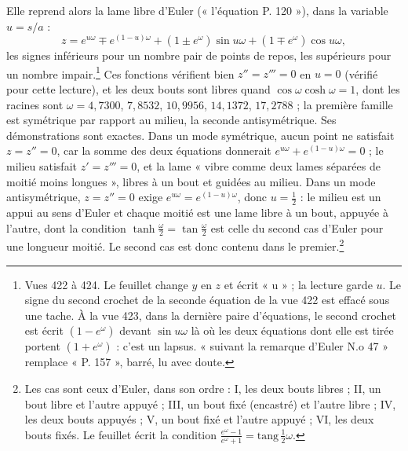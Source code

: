 \documentclass[11pt,a4paper]{article}
\begin{document}
Elle reprend alors la lame libre d'Euler (« l'équation P. 120 »), dans la variable
$u = s/a$ :
\[
z = e^{u\omega} \mp e^{(1-u)\omega} + (1 \pm e^{\omega})\sin u\omega + (1 \mp e^{\omega})\cos u\omega ,
\]
les signes inférieurs pour un nombre pair de points de repos, les supérieurs pour un
nombre impair.\footnote{Vues 422 à 424. Le feuillet change $y$ en $z$ et écrit « u » ;
la lecture garde $u$. Le signe du second crochet de la seconde équation de la vue 422
est effacé sous une tache. À la vue 423, dans la dernière paire d'équations, le
second crochet est écrit $(1-e^{\omega})$ devant $\sin u\omega$ là où les deux
équations dont elle est tirée portent $(1+e^{\omega})$ : c'est un lapsus. « suivant la
remarque d'Euler N.o 47 » remplace « P. 157 », barré, lu avec doute.} Ces fonctions
vérifient bien $z'' = z''' = 0$ en $u = 0$ (vérifié pour cette lecture), et les deux
bouts sont libres quand $\cos\omega\cosh\omega = 1$, dont les racines sont
$\omega = 4{,}7300$, $7{,}8532$, $10{,}9956$, $14{,}1372$, $17{,}2788$ ; la première
famille est symétrique par rapport au milieu, la seconde antisymétrique. Ses
démonstrations sont exactes. Dans un mode symétrique, aucun point ne satisfait
$z = z'' = 0$, car la somme des deux équations donnerait
$e^{u\omega} + e^{(1-u)\omega} = 0$ ; le milieu satisfait $z' = z''' = 0$, et la lame
« vibre comme deux lames séparées de moitié moins longues », libres à un bout et
guidées au milieu. Dans un mode antisymétrique, $z = z'' = 0$ exige
$e^{u\omega} = e^{(1-u)\omega}$, donc $u = \frac12$ : le milieu est un appui au sens
d'Euler et chaque moitié est une lame libre à un bout, appuyée à l'autre, dont la
condition $\tanh\frac{\omega}{2} = \tan\frac{\omega}{2}$ est celle du second cas
d'Euler pour une longueur moitié. Le second cas est donc contenu dans le
premier.\footnote{Les cas sont ceux d'Euler, dans son ordre : I, les deux bouts
libres ; II, un bout libre et l'autre appuyé ; III, un bout fixé (encastré) et l'autre
libre ; IV, les deux bouts appuyés ; V, un bout fixé et l'autre appuyé ; VI, les deux
bouts fixés. Le feuillet écrit la condition
$\frac{e^{\omega}-1}{e^{\omega}+1} = \text{tang}\,\frac12\omega$.}
\end{document}
